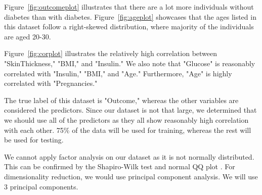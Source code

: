 \documentclass[12pt]{article}
\begin{document}
Figure~\ref{fig:outcomeplot} illustrates that there are a lot more individuals without diabetes than with diabetes. Figure~\ref{fig:ageplot} showcases that the ages listed in this dataset follow a right-skewed distribution, where majority of the individuals are aged 20-30.

Figure~\ref{fig:corplot} illustrates the relatively high correlation between "SkinThickness," "BMI," and "Insulin." We also note that "Glucose" is reasonably correlated with "Insulin," "BMI," and "Age." Furthermore, "Age" is highly correlated with "Pregnancies."

The true label of this dataset is "Outcome," whereas the other variables are considered the predictors. Since our dataset is not that large, we determined that we should use all of the predictors as they all show reasonably high correlation with each other. 75\% of the data will be used for training, whereas the rest will be used for testing.

We cannot apply factor analysis on our dataset as it is not normally distributed. This can be confirmed by the Shapiro-Wilk test \cite{Rlang} and normal QQ plot \cite{Rlang}. For dimensionality reduction, we would use principal component analysis. We will use 3 principal components.


		
\end{document}
